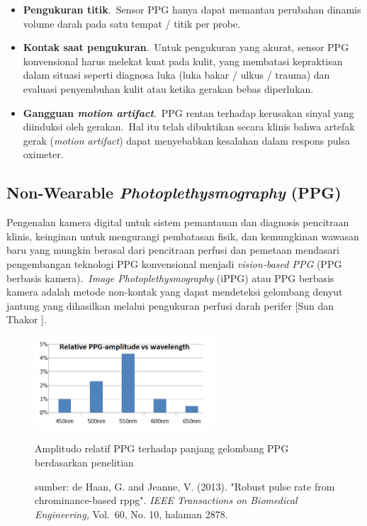 \begin{itemize}
	\item \textbf{Pengukuran titik}.~Sensor PPG hanya dapat memantau perubahan dinamis volume darah pada satu tempat / titik per probe.
	\item \textbf{Kontak saat pengukuran}.~Untuk pengukuran yang akurat, sensor PPG konvensional harus melekat kuat pada kulit, yang membatasi kepraktisan dalam situasi seperti diagnosa luka (luka bakar / ulkus / trauma) dan evaluasi penyembuhan kulit atau ketika gerakan bebas diperlukan.
	\item \textbf{Gangguan \textit{motion artifact}}.~PPG rentan terhadap kerusakan sinyal yang diinduksi oleh gerakan.~Hal itu telah dibuktikan secara klinis bahwa artefak gerak (\textit{motion artifact}) dapat menyebabkan kesalahan dalam respons pulsa oximeter.
\end{itemize}


\subsection{Non-Wearable \textit{Photoplethysmography} (PPG)}

Pengenalan kamera digital untuk sistem pemantauan dan diagnosis pencitraan klinis, keinginan untuk mengurangi pembatasan fisik, dan kemungkinan wawasan baru yang mungkin berasal dari pencitraan perfusi dan pemetaan mendasari pengembangan teknologi PPG konvensional menjadi \textit{vision-based PPG} (PPG berbasis kamera).~\textit{Image Photoplethysmography} (iPPG) atau PPG berbasis kamera adalah metode non-kontak yang dapat mendeteksi gelombang denyut jantung yang dihasilkan melalui pengukuran perfusi darah perifer [Sun dan Thakor \citep{sun2016}].~
\newpage
\begin{figure}[ht]
	\centering
	\includegraphics[width=0.6\textwidth]{wavelength}
	\caption{Amplitudo relatif PPG terhadap panjang gelombang PPG berdasarkan penelitian \citet{Crowe1992}}
	\caption*{sumber: de Haan, G. and Jeanne, V. (2013). "Robust pulse rate from chrominance-based rppg". \textit{IEEE Transactions on Biomedical Engineering,} Vol.~60, No. 10, halaman 2878.}
	\label{fig:wavelength}   
\end{figure}

